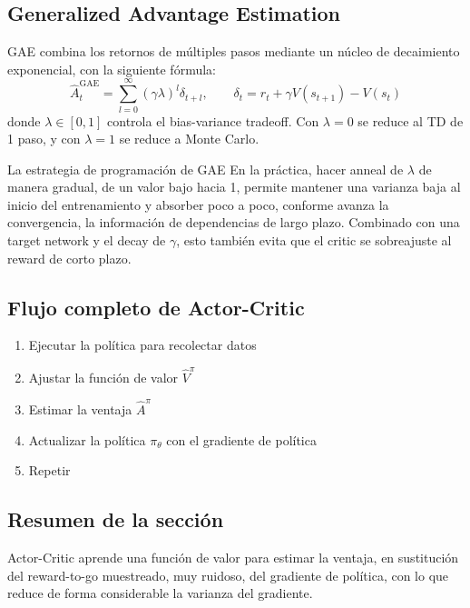 \documentclass[a4paper]{article}
\begin{document}
\subsection{Generalized Advantage Estimation}

GAE combina los retornos de múltiples pasos mediante un núcleo de decaimiento exponencial, con la siguiente fórmula:
$$\hat{A}^\text{GAE}_{t} = \sum_{l=0}^{\infty} (\gamma \lambda)^l \delta_{t+l}, \qquad \delta_t = r_t + \gamma V(s_{t+1}) - V(s_t)$$
donde $\lambda \in [0,1]$ controla el bias-variance tradeoff. Con $\lambda=0$ se reduce al TD de 1 paso, y con $\lambda=1$ se reduce a Monte Carlo.

\begin{importantbox}{La estrategia de programación de GAE}
En la práctica, hacer anneal de $\lambda$ de manera gradual, de un valor bajo hacia 1, permite mantener una varianza baja al inicio del entrenamiento y absorber poco a poco, conforme avanza la convergencia, la información de dependencias de largo plazo. Combinado con una target network y el decay de $\gamma$, esto también evita que el critic se sobreajuste al reward de corto plazo.
\end{importantbox}

\subsection{Flujo completo de Actor-Critic}

\begin{enumerate}
    \item Ejecutar la política para recolectar datos
    \item Ajustar la función de valor $\hat{V}^\pi$
    \item Estimar la ventaja $\hat{A}^\pi$
    \item Actualizar la política $\pi_\theta$ con el gradiente de política
    \item Repetir
\end{enumerate}

\subsection{Resumen de la sección}

Actor-Critic aprende una función de valor para estimar la ventaja, en sustitución del reward-to-go muestreado, muy ruidoso, del gradiente de política, con lo que reduce de forma considerable la varianza del gradiente.
\end{document}
